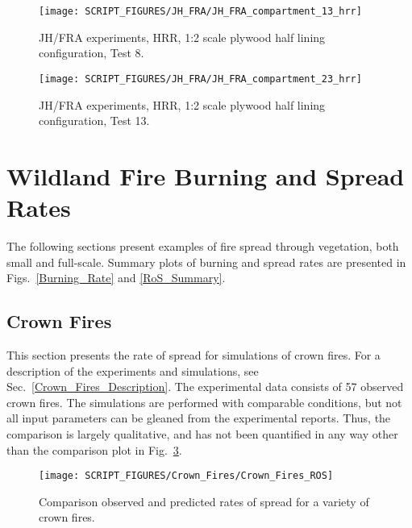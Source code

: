 \begin{figure}[h!]
\centering
\texttt{[image: SCRIPT\_FIGURES/JH\_FRA/JH\_FRA\_compartment\_13\_hrr]}
\caption[JH/FRA experiments, HRR, 1:2 scale plywood half lining configuration, Test 8]{JH/FRA experiments, HRR, 1:2 scale plywood half lining configuration, Test 8.}
\label{JH_FRA_plywood_02}
\end{figure}

\begin{figure}[h!]
\centering
\texttt{[image: SCRIPT\_FIGURES/JH\_FRA/JH\_FRA\_compartment\_23\_hrr]}
\caption[JH/FRA experiments, HRR, 1:1 scale plywood half lining configuration, Test 13]{JH/FRA experiments, HRR, 1:2 scale plywood half lining configuration, Test 13.}
\label{JH_FRA_plywood_03}
\end{figure}


\clearpage

\section{Wildland Fire Burning and Spread Rates}
\label{WUI}

The following sections present examples of fire spread through vegetation, both small and full-scale. Summary plots of burning and spread rates are presented in Figs.~\ref{Burning_Rate} and \ref{RoS_Summary}.


\subsection{Crown Fires}

This section presents the rate of spread for simulations of crown fires. For a description of the experiments and simulations, see Sec.~\ref{Crown_Fires_Description}. The experimental data consists of 57 observed crown fires. The simulations are performed with comparable conditions, but not all input parameters can be gleaned from the experimental reports. Thus, the comparison is largely qualitative, and has not been quantified in any way other than the comparison plot in Fig.~\ref{Crown_Fire_Plot}.

\begin{figure}[ht]
\centering
\texttt{[image: SCRIPT\_FIGURES/Crown\_Fires/Crown\_Fires\_ROS]}
\caption[Comparison observed and predicted rates of spread for a variety of crown fires]{Comparison observed and predicted rates of spread for a variety of crown fires.}
\label{Crown_Fire_Plot}
\end{figure}



